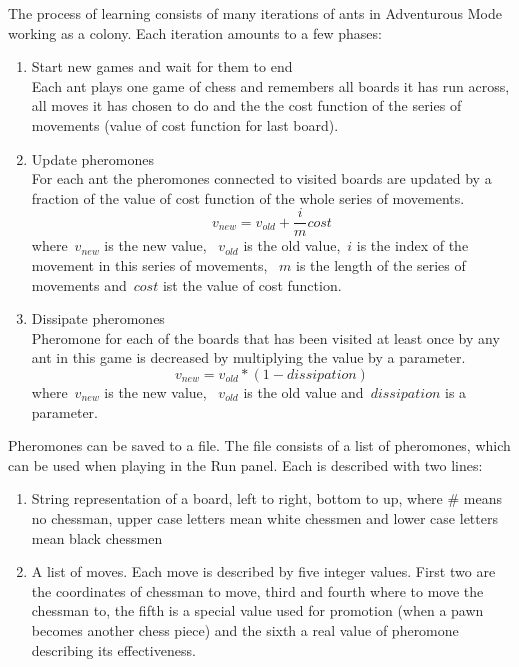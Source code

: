 \documentclass[pdftex]{article}
\begin{document}
The process of learning consists of many iterations of ants in Adventurous Mode working as a colony. Each iteration amounts to a few phases:
\begin{enumerate}
 	\item Start new games and wait for them to end \hfill \\
		Each ant plays one game of chess and remembers all boards it has run across, all moves it has chosen to do and the
the cost function of the series of movements (value of cost function for last board).
	\item Update pheromones \hfill \\
		For each ant the pheromones connected to visited boards are updated by a fraction of the value of cost function of the whole series of movements.
\begin{equation}
	v_{new} = v_{old} + \frac{i}{m} cost
\end{equation}
where~$v_{new}$ is the new value, ~$v_{old}$ is the old value,~$i$ is the index of the movement in this series of movements, ~$m$ is the length of the series of movements and~$cost$ ist the value of cost function.
	\item Dissipate pheromones \hfill \\
		Pheromone for each of the boards that has been visited at least once by any ant in this game is decreased by multiplying the value by a parameter.
\begin{equation}
\label{eq:dissipationequation}
	v_{new} =  v_{old} *  (1 - dissipation)
\end{equation}
where~$v_{new}$ is the new value, ~$v_{old}$ is the old value and~$dissipation$ is a parameter. 
\end{enumerate}

Pheromones can be saved to a file. The file consists of a list of pheromones, which can be used when playing in the Run panel. Each is described with two lines:
\begin{enumerate}
 	\item String representation of a board, left to right, bottom to up, where \# means no chessman, upper case letters mean white chessmen and lower case letters mean black chessmen \hfill \\
	\item A list of moves. Each move is described by five integer values. First two are the coordinates of chessman to move, third and fourth where to move the chessman to, the fifth is a special value used for promotion (when a pawn becomes another chess piece) and the sixth a real value of pheromone describing its effectiveness. \hfill \\
\end{enumerate}
\end{document}
